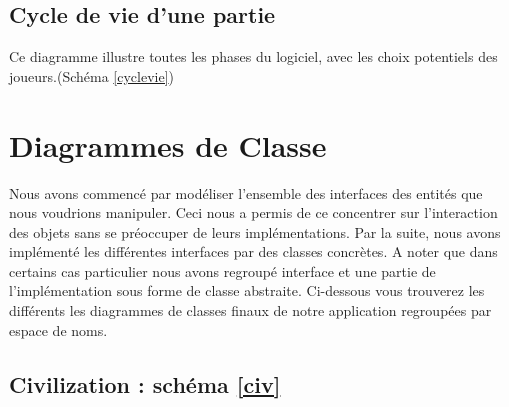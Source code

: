 	\subsection{Cycle de vie d'une partie}
	Ce diagramme illustre toutes les phases du logiciel, avec les choix potentiels des joueurs.(Schéma \ref{cyclevie})
	
\section{Diagrammes de Classe}
Nous avons commencé par modéliser l'ensemble des interfaces des entités que nous voudrions manipuler. Ceci nous a permis de ce concentrer sur l'interaction des objets sans se préoccuper de leurs implémentations. Par la suite, nous avons implémenté les différentes interfaces par des classes concrètes. A noter que dans certains cas particulier nous avons regroupé interface et une partie de l'implémentation sous forme de classe abstraite. Ci-dessous vous trouverez les différents les diagrammes de classes finaux de notre application regroupées par espace de noms. 
	\subsection{Civilization : schéma \ref{civ}}
